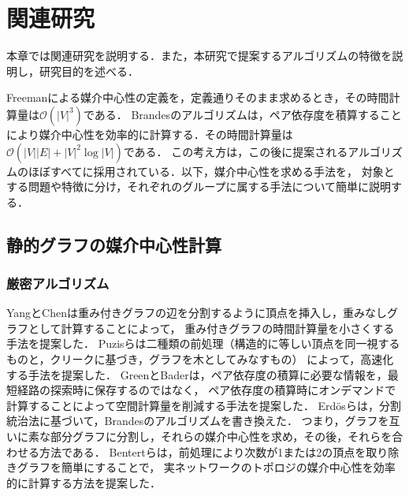 
\chapter{関連研究}
\label{chap:related-work}

本章では関連研究を説明する．また，本研究で提案するアルゴリズムの特徴を説明し，研究目的を述べる．

Freemanによる媒介中心性の定義を，定義通りそのまま求めるとき，その時間計算量は$\mathcal{O}(|V|^3)$である．
Brandesのアルゴリズム\cite{Brandes2001}は，ペア依存度を積算することにより媒介中心性を効率的に計算する．その時間計算量は$\mathcal{O}(|V||E|+|V|^2\log|V|)$である．
この考え方は，この後に提案されるアルゴリズムのほぼすべてに採用されている．以下，媒介中心性を求める手法を，
対象とする問題や特徴に分け，それぞれのグループに属する手法について簡単に説明する．

\section{静的グラフの媒介中心性計算}

\subsection{厳密アルゴリズム}
YangとChen\cite{Yang2011}は重み付きグラフの辺を分割するように頂点を挿入し，重みなしグラフとして計算することによって，
重み付きグラフの時間計算量を小さくする手法を提案した．
Puzisら\cite{Puzis2012}は二種類の前処理（構造的に等しい頂点を同一視するものと，クリークに基づき，グラフを木としてみなすもの）
によって，高速化する手法を提案した．
GreenとBader\cite{Green2013}は，ペア依存度の積算に必要な情報を，最短経路の探索時に保存するのではなく，
ペア依存度の積算時にオンデマンドで計算することによって空間計算量を削減する手法を提案した．
Erd{\"{o}}sら\cite{Erdos2015}は，分割統治法に基づいて，Brandesのアルゴリズムを書き換えた．
つまり，グラフを互いに素な部分グラフに分割し，それらの媒介中心性を求め，その後，それらを合わせる方法である．
Bentertら\cite{Bentert2018}は，前処理により次数が1または2の頂点を取り除きグラフを簡単にすることで，
実ネットワークのトポロジの媒介中心性を効率的に計算する方法を提案した．

